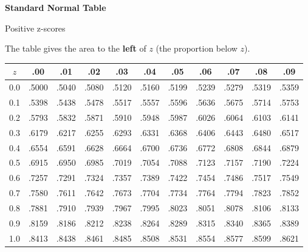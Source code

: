 \documentclass[11pt]{article}
\begin{document}
\newpage
\begin{center}
{\Large\bfseries Standard Normal Table}\par\vspace{0.3em}
Positive z-scores\par\vspace{0.5em}
\par\vspace{0.3em}
{\small The table gives the area to the \textbf{left} of $z$ (the proportion below $z$).}
\par\vspace{0.5em}
\renewcommand{\arraystretch}{1.07}
\setlength{\tabcolsep}{4.6pt}
{\small
\begin{tabular}{|c|cccccccccc|}\hline
$z$ & .00 & .01 & .02 & .03 & .04 & .05 & .06 & .07 & .08 & .09 \\ \hline
0.0 & .5000 & .5040 & .5080 & .5120 & .5160 & .5199 & .5239 & .5279 & .5319 & .5359 \\
0.1 & .5398 & .5438 & .5478 & .5517 & .5557 & .5596 & .5636 & .5675 & .5714 & .5753 \\
0.2 & .5793 & .5832 & .5871 & .5910 & .5948 & .5987 & .6026 & .6064 & .6103 & .6141 \\
0.3 & .6179 & .6217 & .6255 & .6293 & .6331 & .6368 & .6406 & .6443 & .6480 & .6517 \\
0.4 & .6554 & .6591 & .6628 & .6664 & .6700 & .6736 & .6772 & .6808 & .6844 & .6879 \\
\hline
0.5 & .6915 & .6950 & .6985 & .7019 & .7054 & .7088 & .7123 & .7157 & .7190 & .7224 \\
0.6 & .7257 & .7291 & .7324 & .7357 & .7389 & .7422 & .7454 & .7486 & .7517 & .7549 \\
0.7 & .7580 & .7611 & .7642 & .7673 & .7704 & .7734 & .7764 & .7794 & .7823 & .7852 \\
0.8 & .7881 & .7910 & .7939 & .7967 & .7995 & .8023 & .8051 & .8078 & .8106 & .8133 \\
0.9 & .8159 & .8186 & .8212 & .8238 & .8264 & .8289 & .8315 & .8340 & .8365 & .8389 \\
\hline
1.0 & .8413 & .8438 & .8461 & .8485 & .8508 & .8531 & .8554 & .8577 & .8599 & .8621 \\

\end{tabular}}
\end{center}
\end{document}
